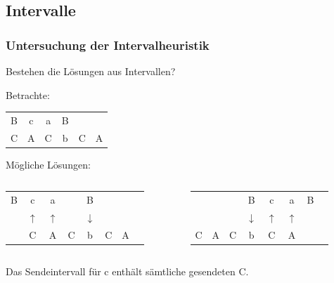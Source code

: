 \documentclass[ignorenonframetext]{beamer}
\newcommand{\mybreak}{\par\vspace*{\baselineskip}}
\begin{document}
\subsection{Intervalle}
\begin{frame}
	
	
	\frametitle{Untersuchung der Intervalheuristik}
	
	Bestehen die Lösungen aus Intervallen?\mybreak
	
	Betrachte:\mybreak
	
	\begin{tabular}{cccccc}
		B & c & a & B &   & \\
		C & A & C & b & C & A
	\end{tabular} \mybreak
	
	\pause
	
	Mögliche Lösungen:\mybreak
	
	
	
	\begin{columns}
		\begin{column}{5cm}
			\begin{tabular}{cccccccc}
				B & c & a & & B \\
				& $\uparrow$ & $\uparrow$ && $\downarrow$ \\
				& C & A & C & b & C & A
			\end{tabular} 
		\end{column}


		\begin{column}{5cm}
			\begin{tabular}{cccccccc}
				&   &   & B & c & a & B \\
				&   &   & $\downarrow$ & $\uparrow$ & $\uparrow$ & \\
				C & A & C & b & C & A
			\end{tabular} 
		\end{column}
	\end{columns}
	
	\mybreak Das Sendeintervall für c enthält sämtliche gesendeten C.
	
%	
\end{frame}
\end{document}
